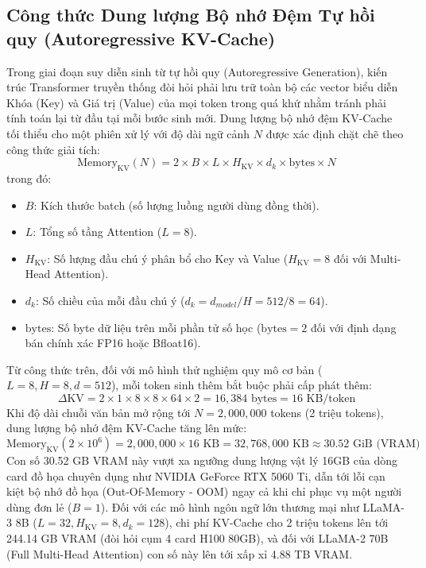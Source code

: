 \documentclass{uetgraduation}
\begin{document}
\subsection{Công thức Dung lượng Bộ nhớ Đệm Tự hồi quy (Autoregressive KV-Cache)}
Trong giai đoạn suy diễn sinh từ tự hồi quy (Autoregressive Generation), kiến trúc Transformer truyền thống đòi hỏi phải lưu trữ toàn bộ các vector biểu diễn Khóa (Key) và Giá trị (Value) của mọi token trong quá khứ nhằm tránh phải tính toán lại từ đầu tại mỗi bước sinh mới. Dung lượng bộ nhớ đệm KV-Cache tối thiểu cho một phiên xử lý với độ dài ngữ cảnh $N$ được xác định chặt chẽ theo công thức giải tích:
\begin{equation}
\text{Memory}_{\text{KV}}(N) = 2 \times B \times L \times H_{\text{KV}} \times d_k \times \text{bytes} \times N
\end{equation}
trong đó:
\begin{itemize}
    \item $B$: Kích thước batch (số lượng luồng người dùng đồng thời).
    \item $L$: Tổng số tầng Attention ($L = 8$).
    \item $H_{\text{KV}}$: Số lượng đầu chú ý phân bổ cho Key và Value ($H_{\text{KV}} = 8$ đối với Multi-Head Attention).
    \item $d_k$: Số chiều của mỗi đầu chú ý ($d_k = d_{model} / H = 512 / 8 = 64$).
    \item $\text{bytes}$: Số byte dữ liệu trên mỗi phần tử số học ($\text{bytes} = 2$ đối với định dạng bán chính xác FP16 hoặc Bfloat16).
\end{itemize}

Từ công thức trên, đối với mô hình thử nghiệm quy mô cơ bản ($L=8, H=8, d=512$), mỗi token sinh thêm bắt buộc phải cấp phát thêm:
\begin{equation}
\Delta \text{KV} = 2 \times 1 \times 8 \times 8 \times 64 \times 2 = 16,384 \text{ bytes} = 16\text{ KB/token}
\end{equation}
Khi độ dài chuỗi văn bản mở rộng tới $N = 2,000,000$ tokens (2 triệu tokens), dung lượng bộ nhớ đệm KV-Cache tăng lên mức:
\begin{equation}
\text{Memory}_{\text{KV}}(2\times 10^6) = 2,000,000 \times 16\text{ KB} = 32,768,000\text{ KB} \approx 30.52\text{ GiB (VRAM)}
\end{equation}
Con số 30.52 GB VRAM này vượt xa ngưỡng dung lượng vật lý 16GB của dòng card đồ họa chuyên dụng như NVIDIA GeForce RTX 5060 Ti, dẫn tới lỗi cạn kiệt bộ nhớ đồ họa (Out-Of-Memory - OOM) ngay cả khi chỉ phục vụ một người dùng đơn lẻ ($B=1$). Đối với các mô hình ngôn ngữ lớn thương mại như LLaMA-3 8B ($L=32, H_{\text{KV}}=8, d_k=128$), chi phí KV-Cache cho 2 triệu tokens lên tới 244.14 GB VRAM (đòi hỏi cụm 4 card H100 80GB), và đối với LLaMA-2 70B (Full Multi-Head Attention) con số này lên tới xấp xỉ 4.88 TB VRAM.
\end{document}
